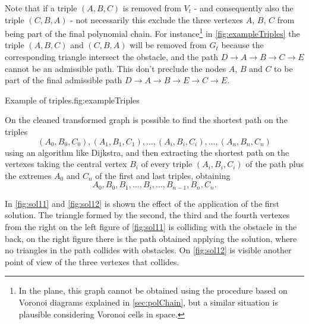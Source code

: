 \documentclass[dissertation.tex]{subfiles}
\begin{document}
Note that if a triple $(A,B,C)$ is removed from $V_t$ - and
consequently also the triple $(C,B,A)$ - not necessarily this exclude
the three vertexes $A$, $B$, $C$ from being part of the final
polynomial chain. For instance\footnote{In the plane, this graph cannot be
  obtained using the procedure based on Voronoi diagrams explained in
  \cref{sec:polChain}, but a similar situation is plausible
  considering Voronoi cells in space.} in
\cref{fig:exampleTriples} the triple
$(A,B,C)$ and $(C,B,A)$ will be removed from $G_t$ because
the corresponding triangle intersect the obstacle, and the path
$D\rightarrow A\rightarrow B\rightarrow C\rightarrow E$ cannot be an
admissible path. This don't preclude the nodes $A$, $B$ and $C$ to be part
of the final admissible path $D\rightarrow A\rightarrow B\rightarrow E\rightarrow C\rightarrow E$.
\begin{myfig}{Example of triples.}{fig:exampleTriples}
\end{myfig}

On the cleaned transformed graph is possible to find the shortest path on the
triples
$$
(A_0,B_0,C_0), (A_1,B_1,C_1),\dots,(A_i,B_i,C_i),\dots,(A_n,B_n,C_n)
$$
 using
an algorithm like Dijkstra, and then extracting the shortest
path on the vertexes taking the central vertex $B_i$ of every
triple $(A_i,B_i,C_i)$ of the path plus the extremes $A_0$ and $C_n$
of the first and last triples, obtaining
$$
A_0,B_0,B_1,\dots,B_i,\dots,B_{n-1},B_n,C_n.
$$

In \cref{fig:sol11} and \cref{fig:sol12} is shown the effect of the
application of the first solution. The triangle formed by the second,
the third and the
fourth vertexes from the right on the left figure of \cref{fig:sol11}
is colliding with the obstacle in the back, on the right figure there
is the path obtained applying the solution, where no triangles in the
path collides with obstacles. On \cref{fig:sol12} is visible another
point of view of the three vertexes that collides.
\end{document}
